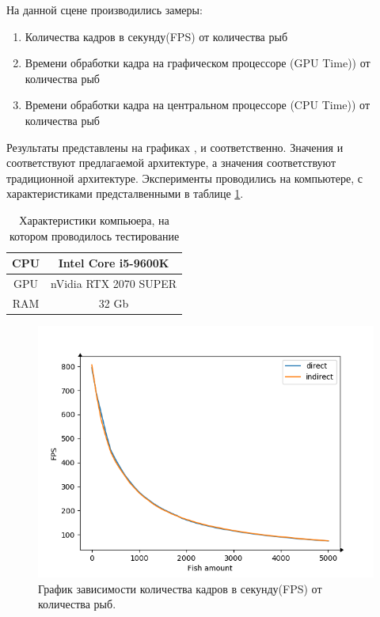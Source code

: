 	\FloatBarrier
	На данной сцене производились замеры:
	\begin{enumerate}[1.]
		\item Количества кадров в секунду(FPS) от количества рыб
		\item Времени обработки кадра на графическом процессоре (GPU Time)) от количества рыб
		\item Времени обработки кадра на центральном процессоре (CPU Time)) от количества рыб
	\end{enumerate}

	Результаты представлены на графиках ,  и  соответственно. Значения  и соответствуют предлагаемой архитектуре, а значения  соответствуют традиционной архитектуре. Эксперименты проводились на компьютере, с характеристиками предсталвенными в таблице \ref{tab:spec}.
	
	\begin{table}[ht]
		\caption{Характеристики компьюера, на котором проводилось тестирование}
		\label{tab:spec}
		\centering
		\begin{SingleSpace}
			\begin{tabular}{|c|c|}
				\hline
				CPU & Intel Core 
				i5-9600K
				\\
				\hline
				GPU & nVidia RTX 2070 SUPER \\
				\hline
				RAM & 32 Gb \\
				\hline
		\end{tabular}
		\end{SingleSpace}
	\end{table}
	
	\begin{figure}[ht!] 
		\center
		\includegraphics [scale=0.8] {my_folder/images//fps_plot}	
		\caption{График зависимости количества кадров в секунду(FPS) от количества рыб. } 
		\label{fig:fps_plot}
	\end{figure}

